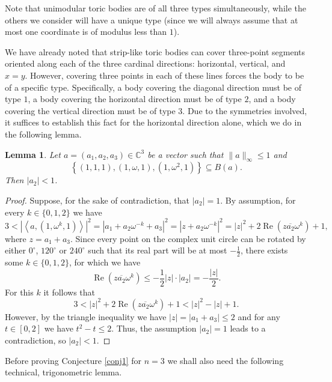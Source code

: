 \documentclass[12pt, a4paper]{article}
\theoremstyle{plain} %
\newtheorem{lemma}[theorem]{Lemma}       %
\theoremstyle{definition} %
\theoremstyle{remark} %
\DeclareMathOperator{\re}{Re}
\begin{document}
Note that unimodular toric bodies are of all three types simultaneously, while the others we consider will have a unique type (since we will always assume that at most one coordinate is of modulus less than $1$).

We have already noted that strip-like toric bodies can cover three-point segments oriented along each of the three cardinal directions: horizontal, vertical, and $x=y$. However, covering three points in each of these lines forces the body to be of a specific type. Specifically, a body covering the diagonal direction must be of type $1$, a body covering the horizontal direction must be of type $2$, and a body covering the vertical direction must be of type $3$. Due to the symmetries involved, it suffices to establish this fact for the horizontal direction alone, which we do in the following lemma.


\begin{lemma}
\label{lem:line}
Let $a=(a_1, a_2, a_3) \in \mathbb{C}^3$ be a vector such that $\|a\|_{\infty} \leq 1$ and
$$\left \{ \left (1, 1, 1 \right), \left (1, \omega, 1 \right), \left (1, \omega^2, 1 \right) \right \} \subseteq B(a).$$
Then $|a_2|<1$.
\end{lemma}
\begin{proof}

Suppose, for the sake of contradiction, that $|a_2| = 1$. By assumption, for every $k \in \{0, 1, 2\}$ we have
$$3 < \left | \left\langle a, \left (1, \omega^k, 1 \right ) \right \rangle  \right |^2=\left | a_1 + a_2 \omega^{-k} + a_3  \right |^2 = \left | z + a_2 \omega^{-k} \right |^2 = |z|^2 + 2\re(z \overline{a_2}\omega^k)+ 1,$$
where $z = a_1+a_3$. Since every point on the complex unit circle can be rotated by either $0^{\circ}$, $120^{\circ}$ or $240^{\circ}$ such that its real part will be at most $-\frac{1}{2}$, there exists some $k \in \{0, 1, 2\}$, for which we have 
$$\re(z \overline{a_2}\omega^k) \leq - \frac{1}{2} |z|\cdot |a_2| = - \frac{|z|}{2}.$$
For this $k$ it follows that
$$3 < |z|^2 + 2\re(z \overline{a_2}\omega^k)+ 1 < |z|^2 - |z| + 1.$$
However, by the triangle inequality we have $|z|=|a_1+a_3| \leq 2$ and for any $t \in [0, 2]$ we have $t^2 - t \leq 2$. Thus, the assumption $|a_2| = 1$ leads to a contradiction, so $|a_2| < 1$.
\end{proof}

Before proving Conjecture \ref{conj1} for $n=3$ we shall also need the following technical, trigonometric lemma. 
\end{document}
